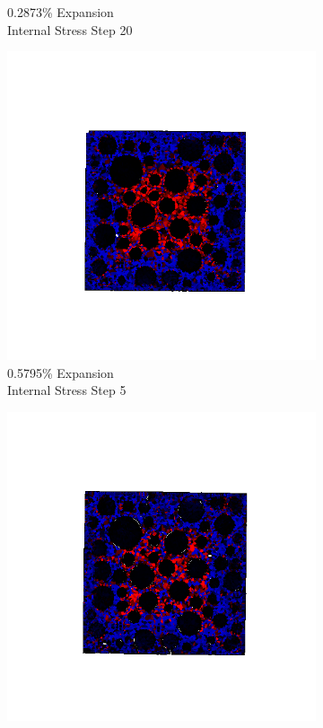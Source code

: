 \begin{figure}[ht!]
\begin{subfigure}{.25\textwidth}
      \caption{0.2873\% Expansion\\Internal Stress Step 20}
    \end{subfigure}

    \begin{subfigure}{.25\textwidth}
      \centering
      \includegraphics[width=1.0\linewidth]{Files/exp_3D/DEF/A30X0C_3_s5.png}
      \caption{0.5795\% Expansion\\Internal Stress Step 5}
    \end{subfigure}%
    \begin{subfigure}{.25\textwidth}
      \centering
      \includegraphics[width=1.0\linewidth]{Files/exp_3D/DEF/A30X0C_3_s10.png}

\end{subfigure}
\end{figure}
